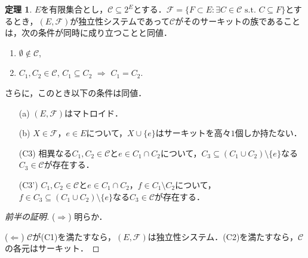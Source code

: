 \documentclass[xelatex,ja=standard,a4paper,14pt,everyparhook=compat]{bxjsarticle}
\theoremstyle{definition}
\newtheorem{theorem}{定理}[subsection]
\begin{document}
\begin{theorem}
    $E$を有限集合とし，$\mathcal{C} \subseteq 2^E$とする．$\mathcal{F} = \{F \subset E : \text{$\exists C \in \mathcal{C}$ s.t. $C \subseteq F$}\}$とするとき，$(E, \mathcal{F})$が独立性システムであって$\mathcal{C}$がそのサーキットの族であることは，次の条件が同時に成り立つことと同値． \begin{enumerate}[label=(C\arabic*)]
        \item $\emptyset \notin \mathcal{C}$,
        \item $C_1, C_2 \in \mathcal{C}$, $C_1 \subseteq C_2$ $\Longrightarrow$ $C_1 = C_2$.
    \end{enumerate}
    さらに，このとき以下の条件は同値． \begin{enumerate}
        \item[(a)] $(E, \mathcal{F})$はマトロイド．
        \item[(b)] $X \in \mathcal{F}$，$e \in E$について，$X \cup \{e\}$はサーキットを高々$1$個しか持たない．
        \item[(C3)] 相異なる$C_1, C_2 \in \mathcal{C}$と$e \in C_1 \cap C_2$について，$C_3 \subseteq (C_1 \cup C_2) \setminus \{e\}$なる$C_3 \in \mathcal{C}$が存在する．
        \item[(C3')] $C_1, C_2 \in \mathcal{C}$と$e \in C_1 \cap C_2$，$f \in C_1 \setminus C_2$について，$f \in C_3 \subseteq (C_1 \cup C_2) \setminus \{e\}$なる$C_3 \in \mathcal{C}$が存在する．
    \end{enumerate}
\end{theorem}
\begin{proof}[\textup{前半の証明}]
    ($\Longrightarrow$) 明らか．

    ($\Longleftarrow$) $\mathcal{C}$が(C1)を満たすなら，$(E, \mathcal{F})$は独立性システム．(C2)を満たすなら，$\mathcal{C}$の各元はサーキット．
\end{proof}
\end{document}
